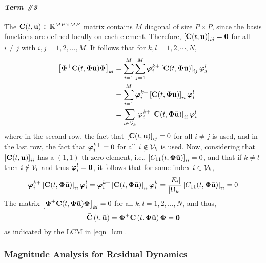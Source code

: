 \paragraph*{\textit{Term \#3}} The $\mathbf{C}(t,\mathbf{u})\in\mathbb{R}^{MP\times MP}$ matrix contains $M$ diagonal of size $P\times P$, since the basis functions are defined locally on each element. Therefore, $\left[\mathbf{C}(t,\mathbf{u})\right]_{ij} = \boldsymbol{0}$ for all $i \neq j$ with $i,j=1,2,\dots,M$. It follows that for $k,l=1,2,\cdots,N$,
\begin{subequations}
    \begin{align}
        \left[\boldsymbol{\Phi}^{+}\mathbf{C}(t,\boldsymbol{\Phi}\bar{\mathbf{u}})\boldsymbol{\Phi}\right]_{kl} &= \sum_{i=1}^{M}\sum_{j=1}^{M}\boldsymbol{\varphi}_{i}^{k+}\left[\mathbf{C}(t,\boldsymbol{\Phi}\bar{\mathbf{u}})\right]_{ij}\boldsymbol{\varphi}_{j}^{l}\\
        &= \sum_{i=1}^{M}\boldsymbol{\varphi}_{i}^{k+}\left[\mathbf{C}(t,\boldsymbol{\Phi}\bar{\mathbf{u}})\right]_{ii}\boldsymbol{\varphi}_{i}^{l}\\
        &= \sum_{i\in\mathcal{V}_k} \boldsymbol{\varphi}_{i}^{k+}\left[\mathbf{C}(t,\boldsymbol{\Phi}\bar{\mathbf{u}})\right]_{ii}\boldsymbol{\varphi}_{i}^{l}
    \end{align}
\end{subequations}
where in the second row, the fact that $\left[\mathbf{C}(t,\mathbf{u})\right]_{ij} = 0$ for all $i\neq j$ is used, and in the last row, the fact that $\boldsymbol{\varphi}_{i}^{k+}=0$ for all $i\notin\mathcal{V}_k$ is used. Now, considering that $\left[\mathbf{C}(t,\mathbf{u})\right]_{ii}$ has a $(1,1)$-th zero element, i.e., $\left[C_{11}(t,\boldsymbol{\Phi}\bar{\mathbf{u}})\right]_{ii} = 0$, and that if $k\neq l$ then $i\notin\mathcal{V}_l$ and thus $\boldsymbol{\varphi}_i^{l}=\boldsymbol{0}$, it follows that for some index $i\in\mathcal{V}_k$,
\begin{equation}
    \boldsymbol{\varphi}_{i}^{k+}\left[\mathbf{C}(t,\boldsymbol{\Phi}\bar{\mathbf{u}})\right]_{ii}\boldsymbol{\varphi}_{i}^{l} = \boldsymbol{\varphi}_{i}^{k+}\left[\mathbf{C}(t,\boldsymbol{\Phi}\bar{\mathbf{u}})\right]_{ii}\boldsymbol{\varphi}_{i}^{k} = \frac{|E_i|}{|\Omega_k|}\left[C_{11}(t,\boldsymbol{\Phi}\bar{\mathbf{u}})\right]_{ii} = 0
\end{equation}
The matrix $\left[\boldsymbol{\Phi}^{+}\mathbf{C}(t,\boldsymbol{\Phi}\bar{\mathbf{u}})\boldsymbol{\Phi}\right]_{kl} = 0$ for all $k,l=1,2,\dots,N$, and thus,
\begin{equation}
    \bar{\mathbf{C}}\left(t,\bar{\mathbf{u}}\right) = \boldsymbol{\Phi}^{+}\mathbf{C}\left(t,\boldsymbol{\Phi}\bar{\mathbf{u}}\right)\boldsymbol{\Phi} = \boldsymbol{0}
\end{equation}
as indicated by the LCM in \cref{eqn_lcm}.

\subsubsection{Magnitude Analysis for Residual Dynamics}

